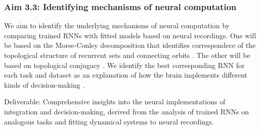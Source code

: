\documentclass[12pt,letterpaper, onecolumn]{article}
\theoremstyle{definition}
\theoremstyle{remark}
\begin{document}
\subsubsection*{Aim 3.3: Identifying mechanisms of neural computation}
We aim to identify the underlying mechanisms of neural computation by comparing trained RNNs with fitted models based on neural recordings.  One will be based on the Morse-Conley decomposition that identifies correspondece of the topological structure of recurrent sets and connecting orbits \citep{arai2009, kaczynski2004computational}. The other will be based on topological conjugacy \citep{ostrow2024beyond}.
We identify the best corresponding RNN for each task and dataset as an explanation of how the brain implements different kinds of decision-making \citep{levenstein2023}.
 


Deliverable:  Comprehensive insights into the neural implementations of integration and decision-making, derived from the analysis of trained RNNs on analogous tasks and fitting dynamical systems to neural recordings.

\newpage
\printbibliography
\end{document}
